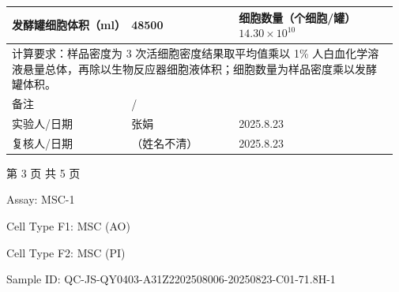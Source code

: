 \documentclass[UTF8,10pt,a4paper,fontset=fandol]{ctexart}
\newcommand{\fieldvalue}[1]{#1}
\newcommand{\handwritten}[1]{#1}
\begin{document}
\noindent
\begin{tabular}{|p{0.30\linewidth}|p{0.27\linewidth}|p{0.40\linewidth}|}
\hline
发酵罐细胞体积（ml）
&
\fieldvalue{\handwritten{48500}}
&
细胞数量（个细胞/罐）
\fieldvalue{\handwritten{$14.30\times 10^{10}$}}\\
\hline
\multicolumn{3}{|p{0.97\linewidth}|}{
计算要求：样品密度为 3 次活细胞密度结果取平均值乘以 1\% 人白血化学溶液悬量总体，再除以生物反应器细胞液体积；细胞数量为样品密度乘以发酵罐体积。
}\\
\hline
备注
&
\fieldvalue{\handwritten{/}}
&\\
\hline
实验人/日期
&
\fieldvalue{\handwritten{张娟}}
&
\fieldvalue{\handwritten{2025.8.23}}\\
\hline
复核人/日期
&
\fieldvalue{\handwritten{（姓名不清）}}
&
\fieldvalue{\handwritten{2025.8.23}}\\
\hline
\end{tabular}

\bigskip

\begin{center}
第 3 页 共 5 页
\end{center}

\newpage

Assay: 
\fieldvalue{MSC-1}

\vspace{0.5em}

Cell Type F1: 
\fieldvalue{MSC (AO)}

\noindent
Cell Type F2: 
\fieldvalue{MSC (PI)}

\vspace{0.5em}

Sample ID: 
\fieldvalue{QC-JS-QY0403-A31Z2202508006-20250823-C01-71.8H-1}
\end{document}
